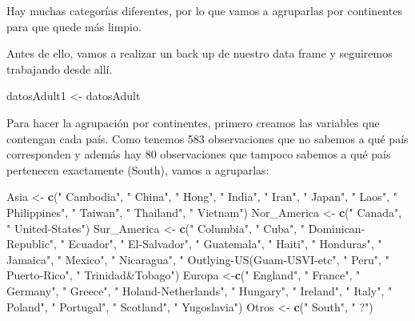 \documentclass[]{article}
\newenvironment{Shaded}{\begin{snugshade}}{\end{snugshade}}
\newcommand{\KeywordTok}[1]{\textcolor[rgb]{0.13,0.29,0.53}{\textbf{#1}}}
\newcommand{\NormalTok}[1]{#1}
\newcommand{\StringTok}[1]{\textcolor[rgb]{0.31,0.60,0.02}{#1}}
\begin{document}
Hay muchas categorías diferentes, por lo que vamos a agruparlas por
continentes para que quede más limpio.

Antes de ello, vamos a realizar un back up de nuestro data frame y
seguiremos trabajando desde allí.

\begin{Shaded}
\begin{Highlighting}[]
\NormalTok{datosAdult1 \textless{}{-}}\StringTok{ }\NormalTok{datosAdult}
\end{Highlighting}
\end{Shaded}

Para hacer la agrupación por continentes, primero creamos las variables
que contengan cada país. Como tenemos 583 observaciones que no sabemos a
qué país corresponden y además hay 80 observaciones que tampoco sabemos
a qué país pertenecen exactamente (South), vamos a agruparlas:

\begin{Shaded}
\begin{Highlighting}[]
\NormalTok{Asia \textless{}{-}}\StringTok{ }\KeywordTok{c}\NormalTok{(}\StringTok{" Cambodia"}\NormalTok{, }\StringTok{" China"}\NormalTok{, }\StringTok{" Hong"}\NormalTok{, }\StringTok{" India"}\NormalTok{, }\StringTok{" Iran"}\NormalTok{, }\StringTok{" Japan"}\NormalTok{, }\StringTok{" Laos"}\NormalTok{, }\StringTok{" Philippines"}\NormalTok{, }\StringTok{" Taiwan"}\NormalTok{, }\StringTok{" Thailand"}\NormalTok{, }\StringTok{" Vietnam"}\NormalTok{)}
\NormalTok{Nor\_America \textless{}{-}}\StringTok{ }\KeywordTok{c}\NormalTok{(}\StringTok{" Canada"}\NormalTok{, }\StringTok{" United{-}States"}\NormalTok{)}
\NormalTok{Sur\_America \textless{}{-}}\StringTok{ }\KeywordTok{c}\NormalTok{(}\StringTok{" Columbia"}\NormalTok{, }\StringTok{" Cuba"}\NormalTok{, }\StringTok{" Dominican{-}Republic"}\NormalTok{, }\StringTok{" Ecuador"}\NormalTok{, }\StringTok{" El{-}Salvador"}\NormalTok{, }\StringTok{" Guatemala"}\NormalTok{, }\StringTok{" Haiti"}\NormalTok{, }\StringTok{" Honduras"}\NormalTok{, }\StringTok{" Jamaica"}\NormalTok{, }\StringTok{" Mexico"}\NormalTok{, }\StringTok{" Nicaragua"}\NormalTok{, }\StringTok{" Outlying{-}US(Guam{-}USVI{-}etc"}\NormalTok{, }\StringTok{" Peru"}\NormalTok{, }\StringTok{" Puerto{-}Rico"}\NormalTok{, }\StringTok{" Trinidad\&Tobago"}\NormalTok{)}
\NormalTok{Europa \textless{}{-}}\KeywordTok{c}\NormalTok{(}\StringTok{" England"}\NormalTok{, }\StringTok{" France"}\NormalTok{, }\StringTok{" Germany"}\NormalTok{, }\StringTok{" Greece"}\NormalTok{, }\StringTok{" Holand{-}Netherlands"}\NormalTok{, }\StringTok{" Hungary"}\NormalTok{, }\StringTok{" Ireland"}\NormalTok{, }\StringTok{" Italy"}\NormalTok{, }\StringTok{" Poland"}\NormalTok{, }\StringTok{" Portugal"}\NormalTok{, }\StringTok{" Scotland"}\NormalTok{, }\StringTok{" Yugoslavia"}\NormalTok{)}
\NormalTok{Otros \textless{}{-}}\StringTok{ }\KeywordTok{c}\NormalTok{(}\StringTok{" South"}\NormalTok{, }\StringTok{" ?"}\NormalTok{)}
\end{Highlighting}
\end{Shaded}
\end{document}
